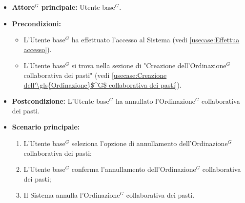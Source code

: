 \label{usecase:Annullamento dell'\gls{Ordinazione}$^G$}
\begin{itemize}
	\item \textbf{\gls{Attore}$^G$ principale:} \gls{Utente base}$^G$.

	\item \textbf{Precondizioni:}
	\begin{itemize}
		\item L'\gls{Utente base}$^G$ ha effettuato l'accesso al Sistema (vedi \autoref{usecase:Effettua accesso}).
		\item L'\gls{Utente base}$^G$ si trova nella sezione di "Creazione dell'\gls{Ordinazione}$^G$ collaborativa dei pasti" (vedi \autoref{usecase:Creazione dell'\gls{Ordinazione}$^G$ collaborativa dei pasti}).
	\end{itemize}

	\item \textbf{Postcondizione:}
	      L'\gls{Utente base}$^G$ ha annullato l'\gls{Ordinazione}$^G$ collaborativa dei pasti.

	\item \textbf{Scenario principale:}
	      \begin{enumerate}
		      \item L'\gls{Utente base}$^G$ seleziona l'opzione di annullamento
		            dell'\gls{Ordinazione}$^G$ collaborativa dei pasti;

		      \item L'\gls{Utente base}$^G$ conferma l'annullamento dell'\gls{Ordinazione}$^G$
		            collaborativa dei pasti;

		      \item Il Sistema annulla l'\gls{Ordinazione}$^G$ collaborativa dei pasti.
	      \end{enumerate}
\end{itemize}
